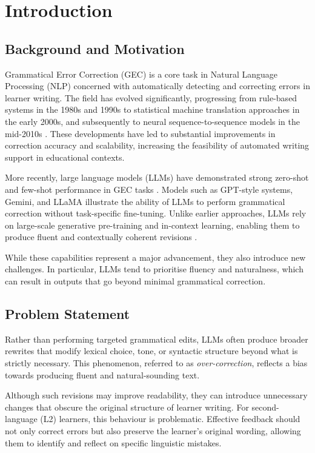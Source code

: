 \chapter{Introduction}

\section{Background and Motivation}

Grammatical Error Correction (GEC) is a core task in Natural Language Processing (NLP) concerned with automatically detecting and correcting errors in learner writing. The field has evolved significantly, progressing from rule-based systems in the 1980s and 1990s to statistical machine translation approaches in the early 2000s, and subsequently to neural sequence-to-sequence models in the mid-2010s \cite{10.1145/3474840}. These developments have led to substantial improvements in correction accuracy and scalability, increasing the feasibility of automated writing support in educational contexts.

More recently, large language models (LLMs) have demonstrated strong zero-shot and few-shot performance in GEC tasks \cite{loem2023exploringeffectivenessgpt3grammatical}. Models such as GPT-style systems, Gemini, and LLaMA illustrate the ability of LLMs to perform grammatical correction without task-specific fine-tuning. Unlike earlier approaches, LLMs rely on large-scale generative pre-training and in-context learning, enabling them to produce fluent and contextually coherent revisions \cite{NEURIPS2020_1457c0d6}.

While these capabilities represent a major advancement, they also introduce new challenges. In particular, LLMs tend to prioritise fluency and naturalness, which can result in outputs that go beyond minimal grammatical correction.

\section{Problem Statement}

Rather than performing targeted grammatical edits, LLMs often produce broader rewrites that modify lexical choice, tone, or syntactic structure beyond what is strictly necessary. This phenomenon, referred to as \textit{over-correction}, reflects a bias towards producing fluent and natural-sounding text.

Although such revisions may improve readability, they can introduce unnecessary changes that obscure the original structure of learner writing. For second-language (L2) learners, this behaviour is problematic. Effective feedback should not only correct errors but also preserve the learner's original wording, allowing them to identify and reflect on specific linguistic mistakes.

